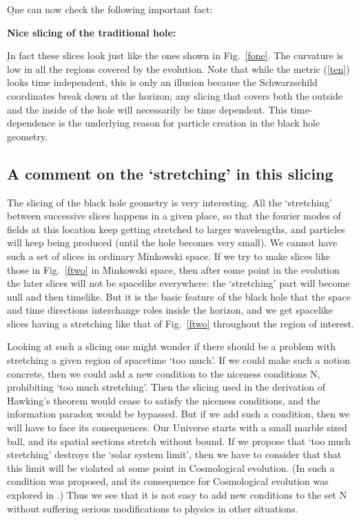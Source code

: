 \documentclass[12pt]{article}
\begin{document}
\b


One can now check the following important fact: 

\b

{\bf Nice slicing of the traditional hole: } 

\b

In fact these slices look just like the ones shown in Fig.~\ref{fone}.   The curvature is low in all the regions covered by the evolution. Note that while the metric (\ref{ten}) looks time independent, this is only an illusion because the Schwarzschild coordinates break down at the horizon; any slicing that covers both the outside and the inside of the hole will necessarily be time dependent.
This time-dependence is the underlying reason for particle creation in the black hole geometry.


\subsection{A comment on the `stretching' in this slicing}

The slicing of the black hole geometry is very interesting. All the `stretching' between successive slices happens in a given place, so that the  fourier modes of fields at this location keep getting stretched to larger wavelengths, and particles will keep being produced (until the hole becomes very small). We cannot have such a set of slices in ordinary Minkowski space. If we try to make slices like those in Fig.~\ref{ftwo} in Minkowski space, then after some point in the evolution the later slices will not be spacelike everywhere: the `stretching' part will become null and then timelike. But it is the basic feature of the black hole that the space and time directions interchange roles inside the horizon, and we get spacelike slices having a stretching like that of Fig.~\ref{ftwo} throughout the region of interest. 


Looking at such a slicing one might wonder if there should be a problem with stretching a given region of spacetime `too much'. If we could make such a notion concrete, then we could add a new condition to the niceness conditions N, prohibiting `too much stretching'. Then  the slicing used in the derivation of Hawking's theorem would cease to satisfy the niceness conditions, and the information paradox would be bypassed. But if we add such a condition, then we will have to face its consequences. Our Universe starts with a small marble sized ball, and its spatial sections stretch without bound. If we propose that `too much stretching' destroys the `solar system limit', then we have to consider that that this limit will be violated at some point in Cosmological evolution. (In \cite{stretch} such a condition was proposed, and its consequence for Cosmological evolution was explored in \cite{cosmo}.)  Thus we see that it is not easy to add new conditions to the set N without suffering serious modifications to physics in other situations. 
\end{document}
